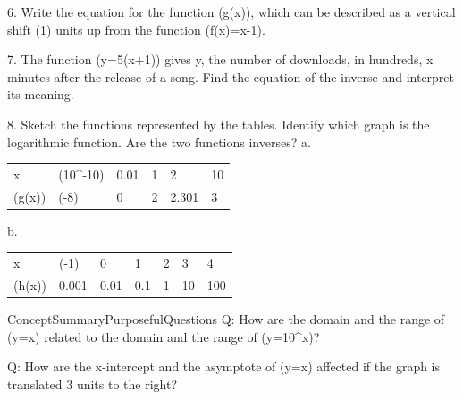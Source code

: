 \documentclass{article}
\newenvironment{concept-summary}{}{}    %
\newenvironment{te-addendum}[2]{}{}     %
\newcommand{\answer}[1]{}               %
\newcommand{\placeholder}[2]{}          %
\begin{document}
\begin{concept-summary}
\answer{domain: (\{x\mid x>0\}); range: all real numbers; x-intercept: 1; asymptote: y-axis; end behavior: As (x\to0), (y\to-\infty). As (x\to\infty), (y\to\infty).}
\placeholder{graph}{Red y=log_4 x, unit square grid x=-3 to 7 and y=-5 to 5, labels x=-2,2,4,6 and y=-4,-2,2,4, x,y,O. Axes arrowed. Curve passes (1,0),(4,1), approaches y-axis downward with arrow, and right arrow near (7,1.4). No point markers.}
6. Write the equation for the function (g(x)), which can be described as a vertical shift (1) units up from the function (f(x)=\ln x-1).
\answer{(g(x)=\ln x+\frac12)}
7. The function (y=5\ln(x+1)) gives y, the number of downloads, in hundreds, x minutes after the release of a song. Find the equation of the inverse and interpret its meaning.
\placeholder{illustration}{Black download progress panel: Downloading... above green partially filled bar labeled y downloads, thin blue line below labeled x minutes.}
\answer{(x=e^{\frac{y}{5}}-1); This function gives x, the number of minutes after the release of a song, in terms of the number of downloads in hundreds, y.}
8. Sketch the functions represented by the tables. Identify which graph is the logarithmic function. Are the two functions inverses?
a.
\begin{tabular}{llllll}
x & (10^{-10}) & 0.01 & 1 & 2 & 10 \\
(g(x)) & (-8) & 0 & 2 & 2.301 & 3 \\
\end{tabular}
b.
\begin{tabular}{lllllll}
x & (-1) & 0 & 1 & 2 & 3 & 4 \\
(h(x)) & 0.001 & 0.01 & 0.1 & 1 & 10 & 100 \\
\end{tabular}
\answer{Yes they are inverses.}
\placeholder{graph}{Square unit grid x=-2 to 5 and y=-2 to 5; labels x,y,O and 2,4 on positive axes; arrowed axes. Blue g=log x+2 vertical asymptote x=0, passes (1,2) and (2,2.301); red h=10^{x-2}, horizontal asymptote y=0, passes (2,1),(3,10) beyond upper window. Both curves arrowed both ends, labeled g and h, no point markers.}
\end{concept-summary}
\begin{te-addendum}{ConceptSummary}{PurposefulQuestions}
Q: How are the domain and the range of (y=\log x) related to the domain and the range of (y=10^x)?
\answer{The domain of (y=\log x) is the same as the range of (y=10^x) and the range of (y=\log x) is the same as the domain of (y=10^x).}
Q: How are the x-intercept and the asymptote of (y=\log x) affected if the graph is translated 3 units to the right?
\answer{The x-intercept and asymptote are also translated 3 units to the right. The x-intercept is 4 and the asymptote is (x=3).}
\end{te-addendum}
\end{document}
